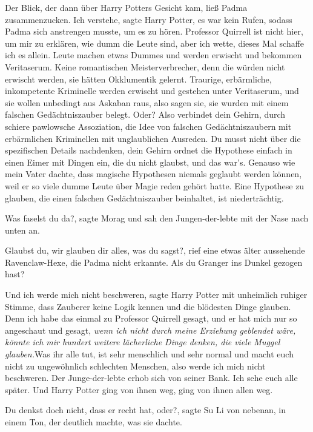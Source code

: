 Der Blick, der dann über Harry Potters Gesicht kam, ließ Padma zusammenzucken.
\glqq{}Ich verstehe\grqq{}, sagte Harry Potter, es war kein Rufen, sodass Padma
sich anstrengen musste, um es zu hören. \glqq{}Professor Quirrell ist nicht hier,
um mir zu erklären, wie dumm die Leute sind, aber ich wette, dieses Mal schaffe
ich es allein. Leute machen etwas Dummes und werden erwischt und bekommen
Veritaserum. Keine romantischen Meisterverbrecher, denn die würden nicht
erwischt werden, sie hätten Okklumentik gelernt. Traurige, erbärmliche,
inkompetente Kriminelle werden erwischt und gestehen unter Veritaserum, und sie
wollen unbedingt aus Askaban raus, also sagen sie, sie wurden mit einem falschen
Gedächtniszauber belegt. Oder? Also verbindet dein Gehirn, durch schiere
pawlowsche Assoziation, die Idee von falschen Gedächtniszaubern mit erbärmlichen
Kriminellen mit unglaublichen Ausreden. Du musst nicht über die spezifischen
Details nachdenken, dein Gehirn ordnet die Hypothese einfach in einen Eimer mit
Dingen ein, die du nicht glaubst, und das war's. Genauso wie mein Vater dachte,
dass magische Hypothesen niemals geglaubt werden können, weil er so viele dumme
Leute über Magie reden gehört hatte. Eine Hypothese zu glauben, die einen
falschen Gedächtniszauber beinhaltet, ist niederträchtig.\grqq{}

\glqq{}Was faselst du da?\grqq{}, sagte Morag und sah den Jungen-der-lebte mit
der Nase nach unten an.

\glqq{}Glaubst du, wir glauben dir alles, was du sagst?\grqq{}, rief eine etwas
älter aussehende Ravenclaw-Hexe, die Padma nicht erkannte. \glqq{}Als du Granger
ins Dunkel gezogen hast?\grqq{}

\glqq{}Und ich werde mich nicht beschweren\grqq{}, sagte Harry Potter mit
unheimlich ruhiger Stimme, \glqq{}dass Zauberer keine Logik kennen und die
blödesten Dinge glauben. Denn ich habe das einmal zu Professor Quirrell gesagt,
und er hat mich nur so angeschaut und gesagt, \emph{wenn ich nicht durch meine
Erziehung geblendet wäre, könnte ich mir hundert weitere lächerliche Dinge
denken, die viele Muggel glauben.}Was ihr alle tut, ist sehr menschlich und sehr
normal und macht euch nicht zu ungewöhnlich schlechten Menschen, also werde ich
mich nicht beschweren.\grqq{} Der Junge-der-lebte erhob sich von seiner Bank.
\glqq{}Ich sehe euch alle später.\grqq{} Und Harry Potter ging von ihnen weg,
ging von ihnen allen weg.

\glqq{}Du denkst doch nicht, dass er recht hat, oder?\grqq{}, sagte Su Li von
nebenan, in einem Ton, der deutlich machte, was sie dachte.


